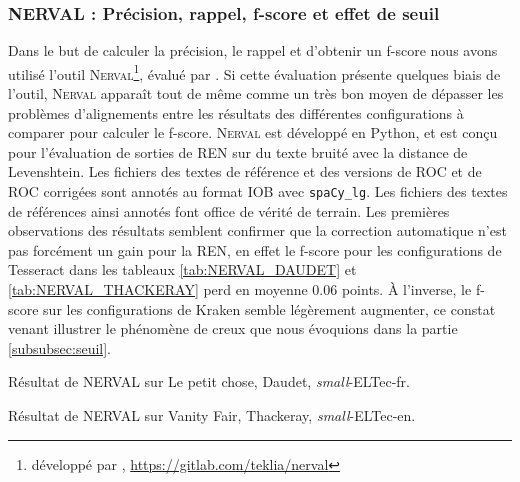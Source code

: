 
\subsubsection{\textsc{NERVAL} : Précision, rappel, f-score et effet de seuil}
\label{subsec:NERVAL_COR-OCR-IMPACT-NER}
Dans le but de calculer la précision, le rappel et d'obtenir un f-score nous avons utilisé l'outil \textsc{Nerval}\footnote{développé par , \url{https://gitlab.com/teklia/nerval}}, évalué par . Si cette évaluation présente quelques biais de l'outil, \textsc{Nerval} apparaît tout de même comme un très bon moyen de dépasser les problèmes d'alignements entre les résultats des différentes configurations à comparer pour calculer le f-score. \textsc{Nerval} est développé en Python, et est conçu pour l'évaluation de sorties de REN sur du texte bruité avec la distance de Levenshtein. Les fichiers des textes de référence et des versions de ROC et de ROC corrigées sont annotés au format IOB avec \texttt{spaCy\_lg}. Les fichiers des textes de références ainsi annotés font office de vérité de terrain.
Les premières observations des résultats semblent confirmer que la correction automatique n'est pas forcément un gain pour la REN, en effet le f-score pour les configurations de Tesseract dans les tableaux \ref{tab:NERVAL_DAUDET} et \ref{tab:NERVAL_THACKERAY} perd en moyenne 0.06 points. À l'inverse, le f-score sur les configurations de Kraken semble légèrement augmenter, ce constat venant illustrer le phénomène de creux que nous évoquions dans la partie \ref{subsubsec:seuil}.

\begin{table}[h!]
     \centering

     \caption{Résultat de \textsc{NERVAL} sur {\normalfont Le petit chose}, Daudet, \textit{small}-ELTec-fr.}
     \label{tab:NERVAL_DAUDET}
 \end{table}

   \begin{table}[h!]
     \centering

    \caption{Résultat de \textsc{NERVAL} sur {\normalfont Vanity Fair}, Thackeray, \textit{small}-ELTec-en.}
     \label{tab:NERVAL_THACKERAY}
 \end{table}

